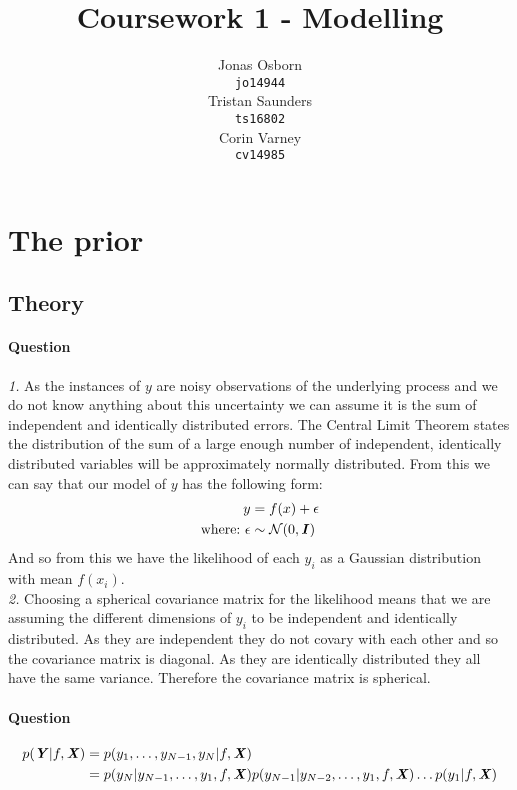 \documentclass{article}
\title{Coursework 1 - Modelling}
\author{
  Jonas Osborn \\
  \texttt{jo14944} \\
  \And
  Tristan Saunders \\
  \texttt{ts16802} \\
  \And
  Corin Varney \\
  \texttt{cv14985} \\
}
\newcounter{question}
\newcommand{\question}{\stepcounter{question}\paragraph{Question \thequestion}}
\newcommand{\mat}[1]{\textbf{\textit{#1}}}
\begin{document}
\maketitle

\section{The prior}
\subsection{Theory}
\question \emph{1.} As the instances of $y$ are noisy observations of the underlying process and we do not know anything about this uncertainty we can assume it is the sum of independent and identically distributed errors. The Central Limit Theorem states the distribution of the sum of a large enough number of independent, identically distributed variables will be approximately normally distributed. From this we can say that our model of $y$ has the following form:
\begin{align*}
	y & = f(x) + \epsilon \\
	\text{where:~}
	\epsilon & \sim \mathcal{N}(0, \mat{I})
\end{align*}
And so from this we have the likelihood of each $y_i$ as a Gaussian distribution with mean $f(x_i)$.\\

\emph{2.} Choosing a spherical covariance matrix for the likelihood means that we are assuming the different dimensions of $y_i$ to be independent and identically distributed. As they are independent they do not covary with each other and so the covariance matrix is diagonal. As they are identically distributed they all have the same variance. Therefore the covariance matrix is spherical.
\question
\begin{align*}
	p(\mat{Y}|f,\mat{X}) &= p(y_1,\ldots,y_{N-1},y_N|f,\mat{X}) \\
	&= p(y_N|y_{N-1},\ldots,y_1,f,\mat{X})p(y_{N-1}|y_{N-2},\ldots,y_1,f,\mat{X})\ldots p(y_1|f,\mat{X}) \\
\end{align*}
\end{document}
